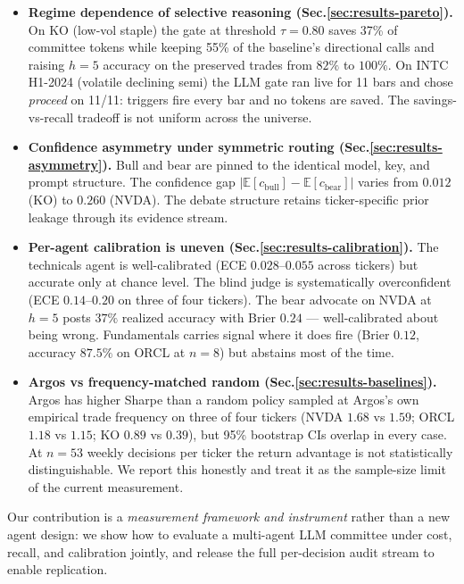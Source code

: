 \documentclass[11pt,a4paper]{article}
\begin{document}
\begin{itemize}\itemsep1pt
  \item \textbf{Regime dependence of selective reasoning
    (Sec.\ref{sec:results-pareto}).} On KO (low-vol staple) the gate at
    threshold $\tau{=}0.80$ saves 37\% of committee tokens while keeping
    55\% of the baseline's directional calls and raising $h{=}5$
    accuracy on the preserved trades from $82\%$ to $100\%$. On INTC
    H1-2024 (volatile declining semi) the LLM gate ran live for 11
    bars and chose \textit{proceed} on 11/11: triggers fire every bar
    and no tokens are saved. The savings-vs-recall tradeoff is not
    uniform across the universe.
  \item \textbf{Confidence asymmetry under symmetric routing
    (Sec.\ref{sec:results-asymmetry}).} Bull and bear are pinned to the
    identical model, key, and prompt structure. The confidence gap
    $|\mathbb{E}[c_{\text{bull}}] - \mathbb{E}[c_{\text{bear}}]|$
    varies from $0.012$ (KO) to $0.260$ (NVDA). The debate structure
    retains ticker-specific prior leakage through its evidence stream.
  \item \textbf{Per-agent calibration is uneven
    (Sec.\ref{sec:results-calibration}).} The technicals agent is
    well-calibrated (ECE $0.028$--$0.055$ across tickers) but
    accurate only at chance level. The blind judge is systematically
    overconfident (ECE $0.14$--$0.20$ on three of four tickers). The
    bear advocate on NVDA at $h{=}5$ posts $37\%$ realized accuracy
    with Brier $0.24$ --- well-calibrated about being wrong. Fundamentals
    carries signal where it does fire (Brier $0.12$, accuracy $87.5\%$
    on ORCL at $n{=}8$) but abstains most of the time.
  \item \textbf{Argos vs frequency-matched random
    (Sec.\ref{sec:results-baselines}).} Argos has higher Sharpe than a
    random policy sampled at Argos's own empirical trade frequency on
    three of four tickers (NVDA $1.68$ vs $1.59$; ORCL $1.18$ vs $1.15$;
    KO $0.89$ vs $0.39$), but 95\% bootstrap CIs overlap in every
    case. At $n{=}53$ weekly decisions per ticker the return advantage
    is not statistically distinguishable. We report this honestly and
    treat it as the sample-size limit of the current measurement.
\end{itemize}

Our contribution is a \emph{measurement framework and instrument}
rather than a new agent design: we show how to evaluate a multi-agent
LLM committee under cost, recall, and calibration jointly, and release
the full per-decision audit stream to enable replication.
\end{document}
